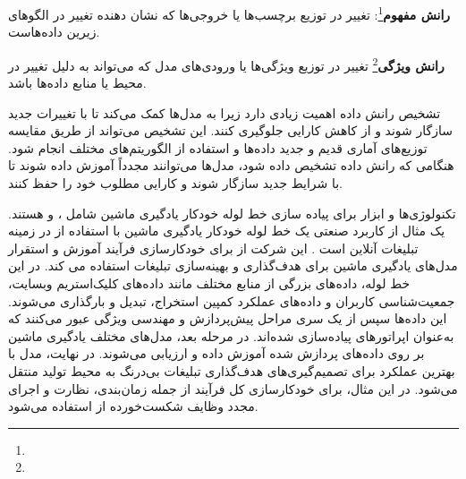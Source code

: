 \textbf{رانش مفهوم}\footnote{}:
 تغییر در توزیع برچسب‌ها یا خروجی‌ها که نشان دهنده تغییر در الگوهای زیرین داده‌هاست.
 
\textbf{رانش ویژگی}\footnote{}
 تغییر در توزیع ویژگی‌ها یا ورودی‌های مدل که می‌تواند به دلیل تغییر در محیط یا منابع داده‌ها باشد.
 
تشخیص رانش داده اهمیت زیادی دارد زیرا به مدل‌ها کمک می‌کند تا با تغییرات جدید سازگار شوند و از کاهش کارایی جلوگیری کنند. این تشخیص می‌تواند از طریق مقایسه توزیع‌های آماری قدیم و جدید داده‌ها و استفاده از الگوریتم‌های مختلف انجام شود. هنگامی که رانش داده تشخیص داده شود، مدل‌ها می‌توانند مجدداً آموزش داده شوند تا با شرایط جدید سازگار شوند و کارایی مطلوب خود را حفظ کنند.

تکنولوژی‌ها و ابزار برای پیاده سازی خط لوله خودکار یادگیری ماشین شامل  ،  و  هستند. یک مثال از کاربرد صنعتی یک خط لوله خودکار یادگیری ماشین با استفاده از  در زمینه تبلیغات آنلاین است \cite{MLOpsArch3}. این شرکت از  برای خودکارسازی فرآیند آموزش و استقرار مدل‌های یادگیری ماشین برای هدف‌گذاری و بهینه‌سازی تبلیغات استفاده می کند. در این خط لوله، داده‌های بزرگی از منابع مختلف مانند داده‌های کلیک‌استریم وبسایت، جمعیت‌شناسی کاربران و داده‌های عملکرد کمپین استخراج، تبدیل و بارگذاری می‌شوند. این داده‌ها سپس از یک سری مراحل پیش‌پردازش و مهندسی ویژگی عبور می‌کنند که به‌عنوان اپراتورهای  پیاده‌سازی شده‌اند. در مرحله بعد، مدل‌های مختلف یادگیری ماشین بر روی داده‌های پردازش شده آموزش داده و ارزیابی می‌شوند. در نهایت، مدل با بهترین عملکرد برای تصمیم‌گیری‌های هدف‌گذاری تبلیغات بی‌درنگ به محیط تولید منتقل می‌شود. در این مثال، برای خودکارسازی کل فرآیند از جمله زمان‌بندی، نظارت و اجرای مجدد وظایف شکست‌خورده از  استفاده می‌شود.